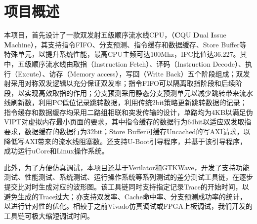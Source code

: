 \section{项目概述}
本项目，首先设计了一款双发射五级顺序流水线CPU，\cpuname（\textbf{C}QU \textbf{D}ual \textbf{I}ssue \textbf{M}achine），其支持指令FIFO、分支预测、指令缓存和数据缓存、Store Buffer等特殊单元，以提升系统性能，最高CPU主频可达100Mhz，IPC比值达36.227。其中，五级顺序流水线由取指（Instruction Fetch）、译码（Instruction Decode）、执行（Excute）、访存（Memory access），写回（Write Back）五个阶段组成；双发射采用对称双发逻辑以充分保证双发率；指令FIFO可以隔离取指阶段和后续阶段，以实现高效取指的作用；分支预测采用静态分支预测单元以减少跳转带来流水线刷新数，利用PC低位记录跳转数据，利用传统2bit策略更新跳转数据的记录；指令缓存和数据缓存均采用二路组相联和突发传输的设计，单路均为4KB以满足伪VIPT对虚拟内存最小页面的要求，其中指令缓存的数据行为64bit以适应双发取指要求，数据缓存的数据行为32bit；Store Buffer可缓存Uncached的写AXI请求，以降低写AXI带来的流水线阻塞数。\cpuname 还支持U-Boot引导程序，并基于该引导程序，成功运行uCore和Linux操作系统。

此外，为了方便仿真调试，本项目还基于Verilator和GTKWave，开发了支持功能测试、性能测试、系统测试、运行操作系统等系列测试的差分测试工具链，在逐步提交比对时生成对应的波形图。该工具链同时支持指定记录Trace的开始时间，以避免生成的Trace过大；亦支持双发率、Cache命中率、分支预测成功率的统计，以进行针对性的优化。相较于之前Vivado仿真调试或FPGA上板调试，我们开发的工具链可极大缩短调试时间。